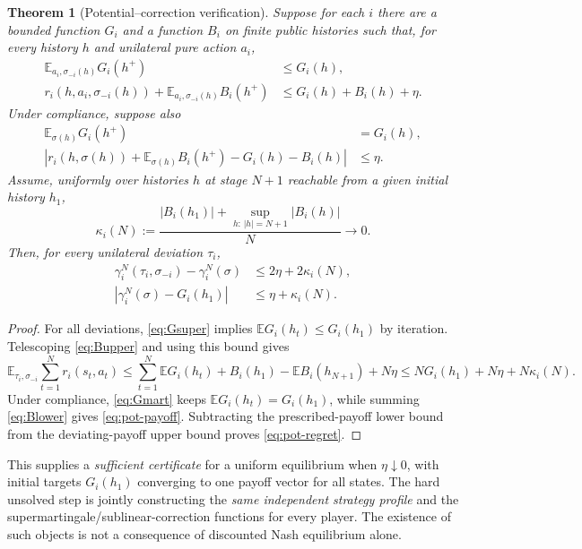 \documentclass[11pt,a4paper]{article}
\newtheorem{theorem}{Theorem}[section]
\theoremstyle{definition}
\theoremstyle{remark}
\newcommand{\E}{\mathbb{E}}
\begin{document}
\begin{theorem}[Potential--correction verification]\label{thm:potential}
Suppose for each $i$ there are a bounded function $G_i$ and a function $B_i$ on finite public histories such that, for every history $h$ and unilateral pure action $a_i$,
\begin{align}
\E_{a_i,\sigma_{-i}(h)}G_i(h^+)&\le G_i(h),\label{eq:Gsuper}\\
r_i(h,a_i,\sigma_{-i}(h))+
\E_{a_i,\sigma_{-i}(h)}B_i(h^+)&\le G_i(h)+B_i(h)+\eta.\label{eq:Bupper}
\end{align}
Under compliance, suppose also
\begin{align}
\E_{\sigma(h)}G_i(h^+)&=G_i(h),\label{eq:Gmart}\\
\left|r_i(h,\sigma(h))+\E_{\sigma(h)}B_i(h^+)-G_i(h)-B_i(h)\right|&\le\eta.\label{eq:Blower}
\end{align}
Assume, uniformly over histories $h$ at stage $N+1$ reachable from a given initial history $h_1$,
\[
\kappa_i(N):=\frac{|B_i(h_1)|+\sup_{h:\,|h|=N+1}|B_i(h)|}{N}\longrightarrow0.
\]
Then, for every unilateral deviation $\tau_i$,
\begin{align}
\gamma_i^N(\tau_i,\sigma_{-i})-\gamma_i^N(\sigma)&\le2\eta+2\kappa_i(N),\label{eq:pot-regret}\\
\left|\gamma_i^N(\sigma)-G_i(h_1)\right|&\le\eta+\kappa_i(N).\label{eq:pot-payoff}
\end{align}
\end{theorem}
\begin{proof}
For all deviations, \eqref{eq:Gsuper} implies $\E G_i(h_t)\le G_i(h_1)$ by iteration. Telescoping \eqref{eq:Bupper} and using this bound gives
\[
\E_{\tau_i,\sigma_{-i}}\sum_{t=1}^N r_i(s_t,a_t)
\le \sum_{t=1}^N\E G_i(h_t)+B_i(h_1)-\E B_i(h_{N+1})+N\eta
\le NG_i(h_1)+N\eta+N\kappa_i(N).
\]
Under compliance, \eqref{eq:Gmart} keeps $\E G_i(h_t)=G_i(h_1)$, while summing \eqref{eq:Blower} gives \eqref{eq:pot-payoff}. Subtracting the prescribed-payoff lower bound from the deviating-payoff upper bound proves \eqref{eq:pot-regret}.
\end{proof}

This supplies a \emph{sufficient certificate} for a uniform equilibrium when $\eta\downarrow0$, with initial targets $G_i(h_1)$ converging to one payoff vector for all states. The hard unsolved step is jointly constructing the \emph{same independent strategy profile} and the supermartingale/sublinear-correction functions for every player. The existence of such objects is not a consequence of discounted Nash equilibrium alone.
\end{document}
